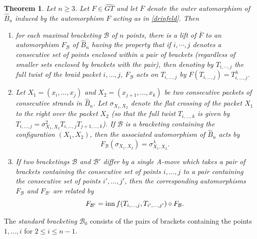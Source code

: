 \documentclass[a4paper,10pt,reqno]{amsart}
\newcommand\B{\widehat{B}}
\newtheorem{thm}{Theorem}[section]
\begin{document}
\begin{thm}\label{Amovetheorem} 
Let $n\ge 3$. Let $F\in \widehat{GT}$ and let 
$\overline{F}$ denote the outer automorphism of $\B_n$ induced by the 
automorphism $F$ acting as in \eqref{drinfeld}.  Then 

\begin{enumerate}
\item[(i)]


for each maximal 
bracketing ${\mathcal{B}}$ of $n$ points, there is a lift of
$\overline{F}$ to an automorphism $F_{\mathcal{B}}$ of 
$\B_n$ having the property that 
if $i,\cdots,j$ denotes a consecutive set of points enclosed within
a pair of brackets (regardless of smaller sets enclosed by brackets with
the pair), then denoting by $T_{i,\cdots,j}$ the full twist of the braid 
packet $i,\ldots,j$, $F_{\mathcal{B}}$ acts on
$T_{i,\ldots,j}$ by $F(T_{i,\ldots,j})=T_{i,\ldots,j}^\lambda$.

\item[(ii)]


Let $X_1=(x_i,\ldots,x_j)$ and $X_2=(x_{j+1},\ldots,x_k)$
be two consecutive packets of consecutive strands in $\B_n$. Let
$\sigma_{X_1,X_2}$ denote the flat crossing of the packet $X_1$ to the
right over the packet $X_2$ (so that the full twist $T_{i,\ldots,k}$ is
given by $T_{i,\ldots,j}=\sigma_{X_1,X_2}^2T_{i,\ldots,j}T_{{j+1},\ldots,k}$).
If ${\mathcal{B}}$ is a bracketing containing the configuration
$(X_1,X_2)$, then the associated automorphism of $\B_n$ acts by
\begin{equation}\label{flatcrossing}
F_{\mathcal{B}}(\sigma_{X_1,X_2})=\sigma_{X_1,X_2}^\lambda.
\end{equation}

\item[(iii)]


If two bracketings ${\mathcal{B}}$ and ${\mathcal{B}'}$ differ
by a single A-move which takes a pair of brackets containing
the consecutive set of points $i,\ldots,j$ to a pair containing
the consecutive set of points $i',\ldots,j'$, then the corresponding 
automorphisms $F_{\mathcal{B}}$ and $F_{\mathcal{B}'}$ are related by
\begin{equation}\label{Amove}
F_{\mathcal{B}'}={\rm inn}\,f(T_{i,\ldots,j}, T_{i',\ldots,j'})
\circ F_{\mathcal{B}}.
\end{equation}
\end{enumerate}
\end{thm}

\vspace{.3cm}
 The {\it standard bracketing} ${\mathcal{B}_0}$
consists of the pairs of brackets containing 
the points $1,\ldots,i$ for $2\le i\le n-1$.
\end{document}
